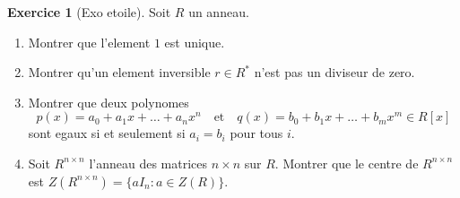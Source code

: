 \documentclass[a4paper,11pt,french]{report}
\theoremstyle{plain}
\theoremstyle{definition}
\newtheorem{exercise}{Exercice}[chapter]
\begin{document}
\begin{exercise}[Exo etoile]
Soit $R$ un anneau.
\begin{enumerate}
\item Montrer que l'element $1$ est unique.
\item Montrer qu'un element inversible $r\in R^{*}$ n'est pas un diviseur de zero.
\item Montrer que deux polynomes 
$$
p(x)=a_{0}+a_{1}x+\dots+a_{n}x^{n}\quad\text{et}\quad q(x)=b_{0}+b_{1}x+\dots+b_{m}x^{m}\in R[x]
$$
sont egaux si et seulement si $a_{i}=b_{i}$ pour tous $i$.
\item Soit $R^{n\times n}$ l'anneau des matrices $n\times n$ sur $R$. Montrer que le centre de $R^{n\times n}$ est $Z(R^{n\times n})=\{ aI_{n}:a\in Z(R) \}$.
\end{enumerate}
\end{exercise}
\end{document}
